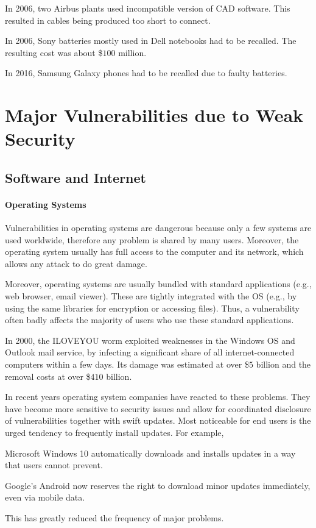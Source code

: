 In 2006, two Airbus plants used incompatible version of CAD software.
This resulted in cables being produced too short to connect.

In 2006, Sony batteries mostly used in Dell notebooks had to be recalled.
The resulting cost was about \$$100$ million.

In 2016, Samsung Galaxy phones had to be recalled due to faulty batteries.

\section{Major Vulnerabilities due to Weak Security}

\subsection{Software and Internet}

\paragraph{Operating Systems}
Vulnerabilities in operating systems are dangerous because only a few systems are used worldwide, therefore any problem is shared by many users.
Moreover, the operating system usually has full access to the computer and its network, which allows any attack to do great damage.

Moreover, operating systems are usually bundled with standard applications (e.g., web browser, email viewer).
These are tightly integrated with the OS (e.g., by using the same libraries for encryption or accessing files).
Thus, a vulnerability often badly affects the majority of users who use these standard applications.

In 2000, the ILOVEYOU worm exploited weaknesses in the Windows OS and Outlook mail service, by infecting a significant share of all internet-connected computers within a few days.
Its damage was estimated at over \$$5$ billion and the removal costs at over \$$410$ billion.

In recent years operating system companies have reacted to these problems.
They have become more sensitive to security issues and allow for coordinated disclosure of vulnerabilities together with swift updates.
Most noticeable for end users is the urged tendency to frequently install updates.
For example,
\begin{compactitem}
\item Microsoft Windows 10 automatically downloads and installs updates in a way that users cannot prevent.
\item Google's Android now reserves the right to download minor updates immediately, even via mobile data.
\end{compactitem}
This has greatly reduced the frequency of major problems.

